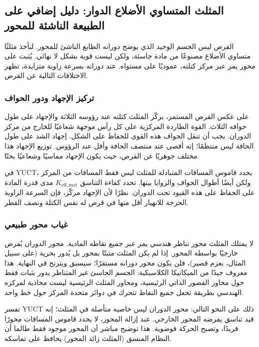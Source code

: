 \documentclass[12pt,a4paper]{article}
\begin{document}
	\subsection{المثلث المتساوي الأضلاع الدوار: دليل إضافي على الطبيعة الناشئة للمحور}
	
	القرص ليس الجسم الوحيد الذي يوضح دورانه الطابع الناشئ للمحور. لنأخذ مثلثًا متساوي الأضلاع مصنوعًا من مادة جاسئة، ولكن ليست قوية بشكل لا نهائي. يُثبت على محور يمر عبر مركز كتلته، عموديًا على مستواه. عند دورانه بسرعة زاوية متزايدة، تظهر الاختلافات التالية عن القرص.
	
	\subsubsection{تركيز الإجهاد ودور الحواف}
	
	على عكس القرص المستمر، يركّز المثلث كتلته عند رؤوسه الثلاثة والإجهاد على طول حوافه الثلاث. القوة الطاردة المركزية على كل رأس موجهة شعاعيًا للخارج من مركز الدوران. يجب أن تنقل الحواف هذه القوى للحفاظ على الشكل. إجهاد الشد على طول الحافة ليس منتظمًا؛ إنه أقصى عند منتصف الحافة وأقل عند الرؤوس. توزيع الإجهاد هذا مختلف جوهريًا عن القرص، حيث يكون الإجهاد مماسيًا وشعاعيًا بحتًا.
	
	في YUCT، يحدد قاموس المسافات المتبادلة للمثلث ليس فقط المسافات من المركز ولكن أيضًا أطوال الحواف والزوايا بينها. تحدد كفاءة التناسق \(K_{\mathrm{eff,mat}}\) مدى قدرة المادة على الحفاظ على هذه القيود تحت الدوران. نظرًا لأن الإجهاد مركّز، فإن السرعة الزاوية الحرجة للانهيار أقل منها في قرص له نفس الكتلة ونصف القطر.
	
	\subsubsection{غياب محور طبيعي}
	
	لا يمتلك المثلث محور تناظر هندسي يمر عبر جميع نقاطه المادية. محور الدوران يُفرض خارجيًا بواسطة المحور. إذا لم يكن المثلث مثبتًا بمحور بل يُدور بحرية (على سبيل المثال، بعزم قصير)، فلن يكون محور دورانه مستقرًا؛ سيسبق ويترنح في النهاية. هذا معروف جيدًا من الميكانيكا الكلاسيكية: الجسم الجاسئ غير المتناظر يدور بثبات فقط حول محاور القصور الذاتي الرئيسية، ومحاور المثلث الرئيسية ليست محاذية لمركزه الهندسي بطريقة تجعل جميع النقاط تتحرك في دوائر متحدة المركز حول خط واحد.
	
	تفسر YUCT ذلك على النحو التالي: محور الدوران ليس خاصية متأصلة في المثلث؛ إنه قيد تناسق يفرضه المحور الخارجي. عند إزالة المحور، لا يحدد قاموس المسافات محورًا فريدًا، وتصبح الحركة فوضوية. هذا توضيح مباشر أن المحور موجود فقط طالما أن النظام المنسق (المثلث زائد المحور) يحافظ على تماسكه.
	
\end{document}
